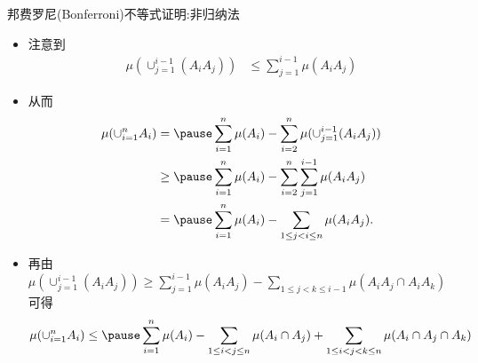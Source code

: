 \documentclass[Prob-All.tex]{subfiles}
\begin{document}
	\begin{frame}{邦费罗尼({\rm Bonferroni})不等式证明:非归纳法}
	\begin{itemize}[<+-|alert@+>]
		\item 注意到
		{\small \begin{align*}
			\mu(\cup_{j=1}^{i-1}(A_iA_j)) &\leq \sum_{j=1}^{i-1}\mu(A_iA_j)
		\end{align*}}
		\item 从而
		{\small \begin{align*}
			\mu(\cup_{i=1}^nA_i) &=\pause \sum_{i=1}^n\mu(A_i)-\sum_{i=2}^n\mu(\cup_{j=1}^{i-1}(A_iA_j)) \\
			&\geq\pause \sum_{i=1}^n\mu(A_i)-\sum_{i=2}^n\sum_{j=1}^{i-1}\mu(A_iA_j) \\
			&=\pause\sum_{i=1}^n\mu(A_i)-\sum_{1\leq j<i\leq n}\mu(A_iA_j).
		  \end{align*}}
		\item 再由{\small $\mu(\cup_{j=1}^{i-1}(A_iA_j)) \geq \sum_{j=1}^{i-1}\mu(A_iA_j)-\sum_{1\leq j<k\leq i-1}\mu(A_iA_j\cap A_iA_k)$}可得\pause
		{\small \begin{align*}
			\mu(\cup_{i=1}^nA_i)\leq\pause \sum_{i=1}^{n} \mu(A_{i})-\sum_{1\leq i<j\leq n} \mu(A_{i} \cap A_{j})+\sum_{1\leq i<j<k\leq n}\mu(A_i\cap A_j\cap A_k)
		\end{align*}}
	\end{itemize}

	\end{frame}
\end{document}
